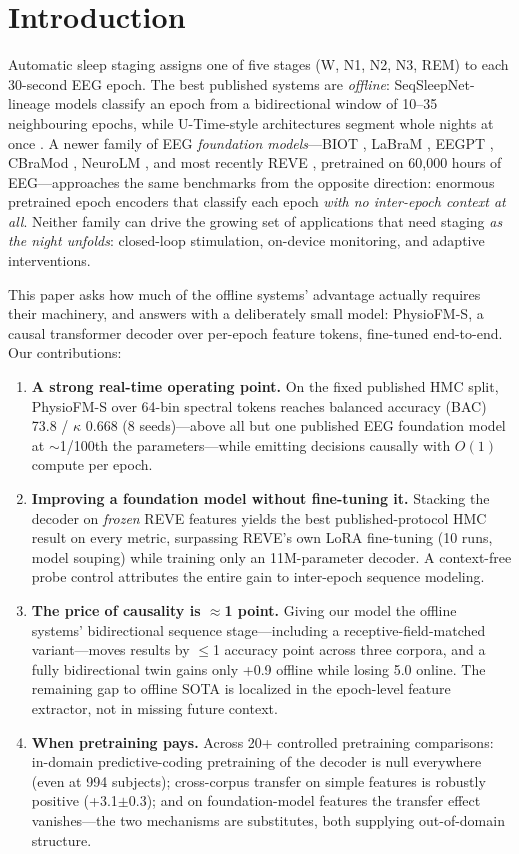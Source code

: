 \documentclass[conference,10pt]{IEEEtran}
\newcommand{\model}{PhysioFM-S}
\begin{document}
\section{Introduction}
Automatic sleep staging assigns one of five stages (W, N1, N2, N3, REM) to each 30-second EEG epoch. The best published systems are \emph{offline}: SeqSleepNet-lineage models \cite{seqsleepnet,xsleepnet,sleeptransformer,sleepyco} classify an epoch from a bidirectional window of 10--35 neighbouring epochs, while U-Time-style architectures segment whole nights at once \cite{utime,usleep}. A newer family of EEG \emph{foundation models}---BIOT \cite{biot}, LaBraM \cite{labram}, EEGPT \cite{eegpt}, CBraMod \cite{cbramod}, NeuroLM \cite{neurolm}, and most recently REVE \cite{reve}, pretrained on 60{,}000 hours of EEG---approaches the same benchmarks from the opposite direction: enormous pretrained epoch encoders that classify each epoch \emph{with no inter-epoch context at all}. Neither family can drive the growing set of applications that need staging \emph{as the night unfolds}: closed-loop stimulation, on-device monitoring, and adaptive interventions.

This paper asks how much of the offline systems' advantage actually requires their machinery, and answers with a deliberately small model: \model{}, a causal transformer decoder over per-epoch feature tokens, fine-tuned end-to-end. Our contributions:
\begin{enumerate}
\item \textbf{A strong real-time operating point.} On the fixed published HMC split, \model{} over 64-bin spectral tokens reaches balanced accuracy (BAC) 73.8 / $\kappa$ 0.668 (8 seeds)---above all but one published EEG foundation model at $\sim$1/100th the parameters---while emitting decisions causally with $O(1)$ compute per epoch.
\item \textbf{Improving a foundation model without fine-tuning it.} Stacking the decoder on \emph{frozen} REVE features yields the best published-protocol HMC result on every metric, surpassing REVE's own LoRA fine-tuning (10 runs, model souping) while training only an 11M-parameter decoder. A context-free probe control attributes the entire gain to inter-epoch sequence modeling.
\item \textbf{The price of causality is $\approx$1 point.} Giving our model the offline systems' bidirectional sequence stage---including a receptive-field-matched variant---moves results by $\leq$1 accuracy point across three corpora, and a fully bidirectional twin gains only +0.9 offline while losing 5.0 online. The remaining gap to offline SOTA is localized in the epoch-level feature extractor, not in missing future context.
\item \textbf{When pretraining pays.} Across 20+ controlled pretraining comparisons: in-domain predictive-coding pretraining of the decoder is null everywhere (even at 994 subjects); cross-corpus transfer on simple features is robustly positive (+3.1$\pm$0.3); and on foundation-model features the transfer effect vanishes---the two mechanisms are substitutes, both supplying out-of-domain structure.
\end{enumerate}
\end{document}

